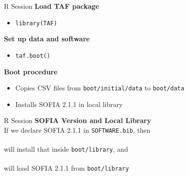 \documentclass[aspectratio=169]{beamer}
\begin{document}
\begin{frame}[fragile]{R Session}
  \textbf{\darkgreen Load TAF package}
  \begin{itemize}
    \item[] \verb|library(TAF)|\\[1ex]
  \end{itemize}
  \vspace{3ex}
  \textbf{\darkgreen Set up data and software}
  \begin{itemize}
    \item[] \verb|taf.boot()|\\[1ex]
  \end{itemize}
  \vspace{3ex}
  \textbf{\darkgreen Boot procedure}\\[0.3ex]
  \begin{itemize}
    \item[] Copies CSV files from \verb|boot/initial/data| to
    \verb|boot/data|\\[1.2ex]
    \item[] Installs SOFIA 2.1.1 in local library\\[1ex]
  \end{itemize}
\end{frame}


\begin{frame}{R Session}
  \textbf{\darkgreen SOFIA Version and Local Library}\\[1.5ex]
  If we declare SOFIA 2.1.1 in {\tt SOFTWARE.bib}, then\\[1ex]
  \\[1ex]
  will {\darkgreen install} that inside {\tt boot/library}, and\\[1ex]
  \\[1ex]
  will {\darkgreen load} SOFIA 2.1.1 from {\tt boot/library}
\end{frame}

\end{document}
